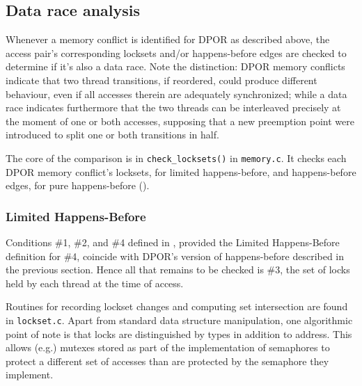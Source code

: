 

\subsection{Data race analysis}
\label{sec:landslide-datarace}

Whenever a memory conflict is identified for DPOR as described above,
the access pair's corresponding locksets and/or happens-before edges are checked to determine if it's also a data race.
Note the distinction: DPOR memory conflicts indicate that two thread transitions,
if reordered, could produce different behaviour, even if all accesses therein are adequately synchronized;
while a data race indicates furthermore that the two threads can be interleaved precisely at the moment of one or both accesses,
supposing that a new preemption point were introduced to split one or both transitions in half.

The core of the comparison is in {\tt check\_locksets()} in {\tt memory.c}.
It checks each DPOR memory conflict's locksets, for limited happens-before,
and happens-before edges, for pure happens-before
(\sect{\ref{sec:background-hb}}).

\subsubsection{Limited Happens-Before}
\label{sec:landslide-lhb}

Conditions \#1, \#2, and \#4 defined in \sect{\ref{sec:background-hb}},
provided the Limited Happens-Before definition for \#4,
coincide with DPOR's version of happens-before described in the previous section.
Hence all that remains to be checked is \#3, the set of locks held by each thread at the time of access.

Routines for recording lockset changes and computing set intersection are found in {\tt lockset.c}.
Apart from standard data structure manipulation,
one algorithmic point of note is that locks are distinguished by types in addition to address.
This allows (e.g.) mutexes stored as part of the implementation of semaphores to protect a different set of accesses than are protected by the semaphore they implement.

